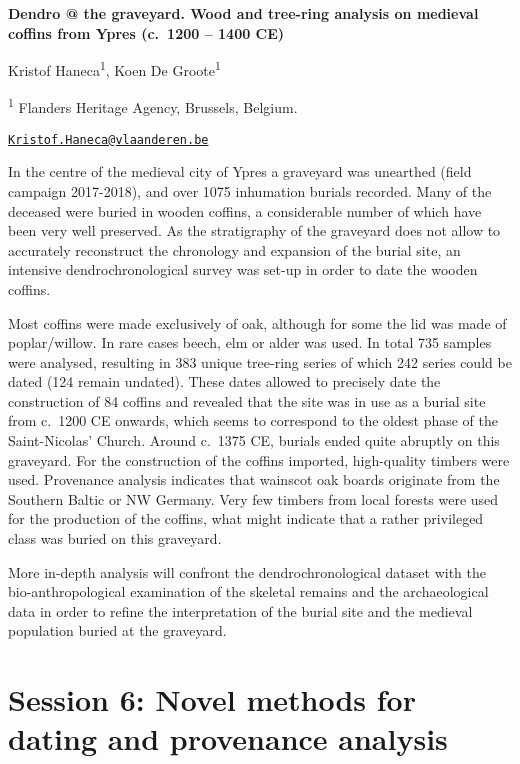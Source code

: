 \documentclass[
]{book}
\begin{document}
\textbf{Dendro @ the graveyard. Wood and tree-ring analysis on medieval coffins from Ypres (c.~1200 -- 1400 CE)}

Kristof Haneca\textsuperscript{1}, Koen De Groote\textsuperscript{1}

\textsuperscript{1} Flanders Heritage Agency, Brussels, Belgium.

\href{mailto:Kristof.Haneca@vlaanderen.be}{\nolinkurl{Kristof.Haneca@vlaanderen.be}}

In the centre of the medieval city of Ypres a graveyard was unearthed (field campaign 2017-2018), and over 1075 inhumation burials recorded. Many of the deceased were buried in wooden coffins, a considerable number of which have been very well preserved. As the stratigraphy of the graveyard does not allow to accurately reconstruct the chronology and expansion of the burial site, an intensive dendrochronological survey was set-up in order to date the wooden coffins.

Most coffins were made exclusively of oak, although for some the lid was made of poplar/willow. In rare cases beech, elm or alder was used. In total 735 samples were analysed, resulting in 383 unique tree-ring series of which 242 series could be dated (124 remain undated). These dates allowed to precisely date the construction of 84 coffins and revealed that the site was in use as a burial site from c.~1200 CE onwards, which seems to correspond to the oldest phase of the Saint-Nicolas' Church. Around c.~1375 CE, burials ended quite abruptly on this graveyard. For the construction of the coffins imported, high-quality timbers were used. Provenance analysis indicates that wainscot oak boards originate from the Southern Baltic or NW Germany. Very few timbers from local forests were used for the production of the coffins, what might indicate that a rather privileged class was buried on this graveyard.

More in-depth analysis will confront the dendrochronological dataset with the bio-anthropological examination of the skeletal remains and the archaeological data in order to refine the interpretation of the burial site and the medieval population buried at the graveyard.

\hypertarget{session-6-novel-methods-for-dating-and-provenance-analysis}{%
\chapter*{Session 6: Novel methods for dating and provenance analysis}\label{session-6-novel-methods-for-dating-and-provenance-analysis}}
\end{document}
